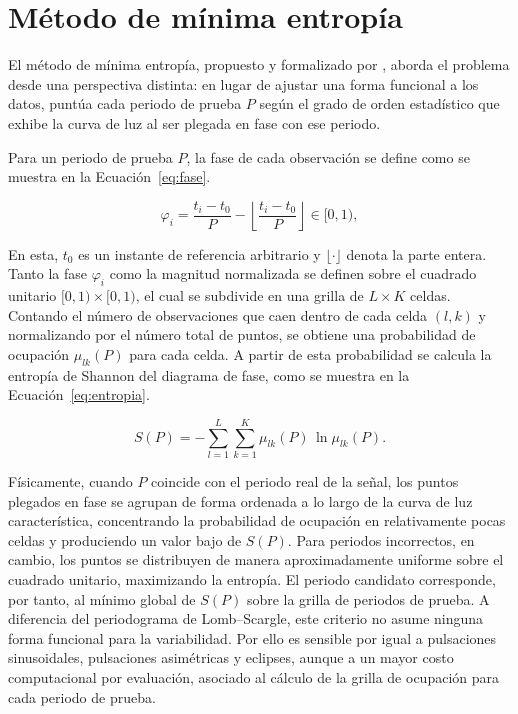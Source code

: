 \documentclass[12pt,letterpaper,oneside]{book}
\begin{document}
\section{M\'etodo de m\'inima entrop\'ia}
\label{sec:metodologia-entropia}

El m\'etodo de m\'inima entrop\'ia, propuesto y formalizado por \citet{cincotta_1995,cincotta_1999}, aborda el problema desde una perspectiva distinta: en lugar de ajustar una forma funcional a los datos, punt\'ua cada periodo de prueba $P$ seg\'un el grado de orden estad\'istico que exhibe la curva de luz al ser plegada en fase con ese periodo.

Para un periodo de prueba $P$, la fase de cada observaci\'on se define como se muestra en la Ecuaci\'on~\eqref{eq:fase}.

\begin{equation}
	\varphi_i = \frac{t_i - t_0}{P} - \left\lfloor \frac{t_i - t_0}{P} \right\rfloor \in [0, 1),
	\label{eq:fase}
\end{equation}

En esta, $t_0$ es un instante de referencia arbitrario y $\lfloor \cdot \rfloor$ denota la parte entera. Tanto la fase $\varphi_i$ como la magnitud normalizada se definen sobre el cuadrado unitario $[0,1)\times[0,1)$, el cual se subdivide en una grilla de $L \times K$ celdas. Contando el n\'umero de observaciones que caen dentro de cada celda $(l,k)$ y normalizando por el n\'umero total de puntos, se obtiene una probabilidad de ocupaci\'on $\mu_{lk}(P)$ para cada celda. A partir de esta probabilidad se calcula la entrop\'ia de Shannon del diagrama de fase, como se muestra en la Ecuaci\'on~\eqref{eq:entropia}.

\begin{equation}
	S(P) = -\sum_{l=1}^{L}\sum_{k=1}^{K} \mu_{lk}(P)\,\ln \mu_{lk}(P).
	\label{eq:entropia}
\end{equation}

F\'isicamente, cuando $P$ coincide con el periodo real de la se\~nal, los puntos plegados en fase se agrupan de forma ordenada a lo largo de la curva de luz caracter\'istica, concentrando la probabilidad de ocupaci\'on en relativamente pocas celdas y produciendo un valor bajo de $S(P)$. Para periodos incorrectos, en cambio, los puntos se distribuyen de manera aproximadamente uniforme sobre el cuadrado unitario, maximizando la entrop\'ia. El periodo candidato corresponde, por tanto, al m\'inimo global de $S(P)$ sobre la grilla de periodos de prueba. A diferencia del periodograma de Lomb--Scargle, este criterio no asume ninguna forma funcional para la variabilidad. Por ello es sensible por igual a pulsaciones sinusoidales, pulsaciones asim\'etricas y eclipses, aunque a un mayor costo computacional por evaluaci\'on, asociado al c\'alculo de la grilla de ocupaci\'on para cada periodo de prueba.
\end{document}
